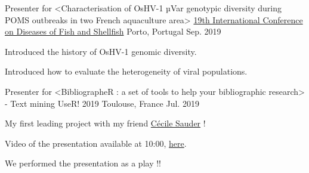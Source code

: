 

\begin{cventries}

  \cventry
    {Presenter for <Characterisation of OsHV-1 µVar genotypic diversity during POMS outbreaks in two French aquaculture area>} %
    {\href{https://eafp.org/19-eafp-porto-2019/}{19th International Conference on Diseases of Fish and Shellfish}} %
    {Porto, Portugal} %
    {Sep. 2019} %
    {
      \begin{cvitems} %
        \item {Introduced the history of OsHV-1 genomic diversity.}
        \item {Introduced how to evaluate the heterogeneity of viral populations.}
      \end{cvitems}
    }

  \cventry
    {Presenter for <BibliographeR : a set of tools to help your bibliographic research>  - Text mining} %
    {UseR! 2019} %
    {Toulouse, France} %
    {Jul. 2019} %
    {
      \begin{cvitems} %
        \item {My first leading project with my friend \href{https://twitter.com/cecilesauder}{Cécile Sauder} !}
        \item {Video of the presentation available at 10:00, \href{https://www.youtube.com/watch?v=6V_nu0K_3mk&list=PL4IzsxWztPdm9_UFnWOCG7Rmw3oW5Fgju}{here}.}
        \item {We performed the presentation as a play !!}
      \end{cvitems}
    }

\end{cventries}
